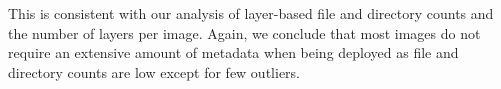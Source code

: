 This is consistent with our analysis of layer-based file and directory counts
and the number of layers per image. Again, we conclude that most images do not
require an extensive amount of metadata when being deployed as file and
directory counts are low except for few outliers.

%

